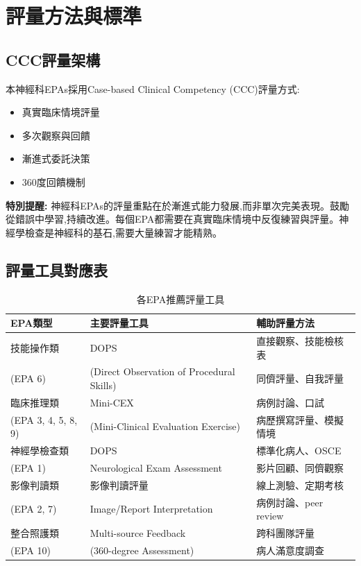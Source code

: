 \documentclass[12pt,a4paper]{article}
\begin{document}
\newpage
\section{評量方法與標準}

\subsection{CCC評量架構}
本神經科EPAs採用Case-based Clinical Competency (CCC)評量方式:
\begin{itemize}[nosep]
    \item 真實臨床情境評量
    \item 多次觀察與回饋
    \item 漸進式委託決策
    \item 360度回饋機制
\end{itemize}

\begin{importantbox}
\textbf{特別提醒:} 神經科EPAs的評量重點在於漸進式能力發展,而非單次完美表現。鼓勵從錯誤中學習,持續改進。每個EPA都需要在真實臨床情境中反復練習與評量。神經學檢查是神經科的基石,需要大量練習才能精熟。
\end{importantbox}

\subsection{評量工具對應表}
\begin{table}[h]
    \centering
    \caption{各EPA推薦評量工具}
    \begin{tabular}{p{4.5cm} p{4cm} p{5.5cm}}
        \toprule
        \textbf{EPA類型} & \textbf{主要評量工具} & \textbf{輔助評量方法} \\
        \midrule
        技能操作類 & DOPS & 直接觀察、技能檢核表 \\
        (EPA 6) & (Direct Observation of Procedural Skills) & 同儕評量、自我評量 \\
        \midrule
        臨床推理類 & Mini-CEX & 病例討論、口試 \\
        (EPA 3, 4, 5, 8, 9) & (Mini-Clinical Evaluation Exercise) & 病歷撰寫評量、模擬情境 \\
        \midrule
        神經學檢查類 & DOPS & 標準化病人、OSCE \\
        (EPA 1) & Neurological Exam Assessment & 影片回顧、同儕觀察 \\
        \midrule
        影像判讀類 & 影像判讀評量 & 線上測驗、定期考核 \\
        (EPA 2, 7) & Image/Report Interpretation & 病例討論、peer review \\
        \midrule
        整合照護類 & Multi-source Feedback & 跨科團隊評量 \\
        (EPA 10) & (360-degree Assessment) & 病人滿意度調查 \\
        \bottomrule
    \end{tabular}
\end{table}
\end{document}
